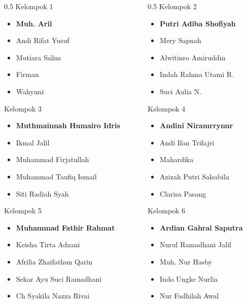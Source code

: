 \documentclass[../main.tex]{subfiles}
\begin{document}
\begin{frame}[mytitle=standard,t,mycolor=digiPH_gray,light]
	\begin{columns}
		\begin{column}{0.5\textwidth}
			Kelompok 1
			\begin{itemize}
				\item \textbf{Muh. Aril}
				\item Andi Rifat Yusuf
				\item Mutiara Salim
				\item Firman
				\item Wahyuni
			\end{itemize}
			Kelompok 3
			\begin{itemize}
				\item \textbf{Muthmainnah Humairo Idris}
				\item Ikmal Jalil
				\item Muhammad Firjatullah
				\item Muhammad Taufiq Ismail
				\item Siti Radiah Syah
			\end{itemize}
			Kelompok 5
			\begin{itemize}
				\item \textbf{Muhammad Fathir Rahmat}
				\item Keisha Tirta Adzani
				\item Afrilia Zhaifathun Qarin
				\item Sekar Ayu Suci Ramadhani
				\item Ch Syakila Nazza Rivai
			\end{itemize}



		\end{column}
		\begin{column}{0.5\textwidth}
			Kelompok 2
			\begin{itemize}
				\item \textbf{Putri Adiba Shofiyah}
				\item Mery Sapnah
				\item Alwitinro Amiruddin
				\item Indah Rahma Utami R.
				\item Suci Aulia N.
			\end{itemize}
			Kelompok 4
			\begin{itemize}
				\item \textbf{Andini Niramrrynur}
				\item Andi Ifan Trifajri
				\item Mahardika
				\item Azizah Putri Salsabila
				\item Clarisa Pasang
			\end{itemize}
			Kelompok 6
			\begin{itemize}
				\item \textbf{Ardian Gahral Saputra}
				\item Nurul Ramadhani Jalil
				\item Muh. Nur Hasby
				\item Indo Ungke Nurlia
				\item Nur Fadhilah Awal
			\end{itemize}



\end{column}
\end{columns}
\end{frame}
\end{document}
